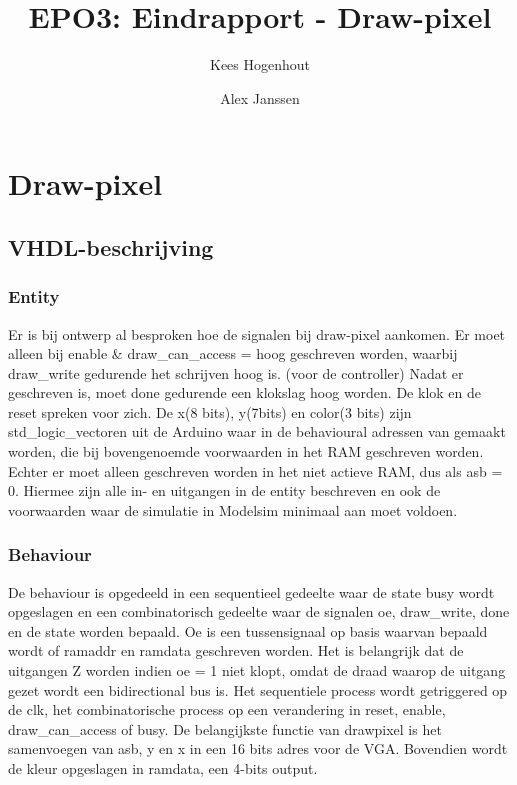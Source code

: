 \documentclass{scrartcl} %
\author{Kees Hogenhout \and Alex Janssen}
\title{EPO3: Eindrapport - Draw-pixel}
\begin{document}
\section{Draw-pixel}
\label{sec:draw-fill}

\subsection{VHDL-beschrijving}
\subsubsection{Entity}
Er is bij ontwerp al besproken hoe de signalen bij draw-pixel aankomen. Er moet alleen bij enable \& draw\_can\_access = hoog geschreven worden, waarbij draw\_write gedurende het schrijven hoog is. (voor de controller)  Nadat er geschreven is, moet done gedurende een klokslag hoog worden. De klok en de reset spreken voor zich. De x(8 bits), y(7bits) en color(3 bits) zijn std\_logic\_vectoren uit de Arduino waar in de behavioural adressen van gemaakt worden, die bij bovengenoemde voorwaarden in het RAM geschreven worden. Echter er moet alleen geschreven worden in het niet actieve RAM, dus als asb = 0.  Hiermee zijn alle in- en uitgangen in de entity beschreven en ook de voorwaarden waar de simulatie in Modelsim minimaal aan moet voldoen. 

\subsubsection{Behaviour}
De behaviour is opgedeeld in een sequentieel gedeelte waar de state busy wordt opgeslagen en een combinatorisch gedeelte waar de signalen oe, draw\_write, done en de state worden bepaald. Oe is een tussensignaal op basis waarvan bepaald wordt of ramaddr en ramdata geschreven worden. Het is belangrijk dat de uitgangen Z worden indien oe = 1 niet klopt, omdat de draad waarop de uitgang gezet wordt een bidirectional bus is. Het sequentiele process wordt getriggered op de clk, het combinatorische process op een verandering in reset, enable, draw\_can\_access of busy. De belangijkste functie
van drawpixel is het samenvoegen van asb, y en x in een 16 bits adres voor de VGA. Bovendien wordt de kleur opgeslagen in ramdata, een 4-bits output. 
\end{document}
